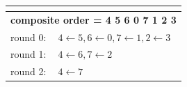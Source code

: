\documentclass[a4paper,10pt]{report}
\begin{document}
\begin{figure}
\begin{minipage}{0.3\textwidth}
{\footnotesize
\def\arraystretch{1.25}
\begin{tabular}{|ll|}
\multicolumn{2}{c}{} \\ \hline
\multicolumn{2}{|c|}{\bf composite order = 4 5 6 0 7 1 2 3} \\ \hline
round 0: & $4 \leftarrow 5, 6 \leftarrow 0, 7 \leftarrow 1, 2 \leftarrow 3$  \\
round 1: & $4 \leftarrow 6, 7 \leftarrow 2$  \\
round 2: & $4 \leftarrow 7$ \\ \hline
\end{tabular}}
\end{minipage}
\end{figure}

\end{document}
